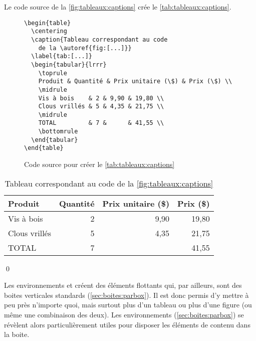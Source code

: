 \begin{exemple}
  Le code source de la \autoref{fig:tableaux:captions} crée
  le \autoref{tab:tableaux:captions}.
  \begin{figure}
\begin{lstlisting}
\begin{table}
  \centering
  \caption{Tableau correspondant au code
    de la \autoref{fig:[...]}}
  \label{tab:[...]}
  \begin{tabular}{lrrr}
    \toprule
    Produit & Quantité & Prix unitaire (\$) & Prix (\$) \\
    \midrule
    Vis à bois    & 2 & 9,90 & 19,80 \\
    Clous vrillés & 5 & 4,35 & 21,75 \\
    \midrule
    TOTAL         & 7 &      & 41,55 \\
    \bottomrule
  \end{tabular}
\end{table}
\end{lstlisting}
    \caption{Code source pour créer le \autoref{tab:tableaux:captions}}
    \label{fig:tableaux:captions}
  \end{figure}
  \begin{table}
    \centering
    \caption{Tableau correspondant au code de la \autoref{fig:tableaux:captions}}
    \label{tab:tableaux:captions}
    \begin{tabular}{lrrr}
      \toprule
      Produit & Quantité & Prix unitaire (\$) & Prix (\$) \\
      \midrule
      Vis à bois    & 2 & 9,90 & 19,80 \\
      Clous vrillés & 5 & 4,35 & 21,75 \\
      \midrule
      TOTAL         & 7 &      & 41,55 \\
      \bottomrule
    \end{tabular}
  \end{table}
  \qed
\end{exemple}

Les environnements  et  créent des éléments
flottants qui, par ailleurs, sont des boites verticales standards
(\autoref{sec:boites:parbox}). Il est donc permis d'y mettre à peu
près n'importe quoi, mais surtout plus d'un tableau ou plus d'une
figure (ou même une combinaison des deux). Les environnements
 (\autoref{sec:boites:parbox}) se révèlent alors
particulièrement utiles pour disposer les éléments de contenu dans la
boite.

